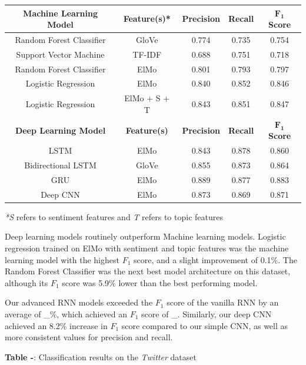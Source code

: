 \documentclass[12pt,a4paper]{article}
\begin{document}
\begin{center}
	\begin{tabular}{ |c||c|c|c|c|}
		\hline
		\textbf{Machine Learning Model}& \textbf{Feature(s)*} & \textbf{Precision} & \textbf{Recall} & \textbf{$\mathbf{F_1}$ Score}\\
		\hline\hline
		Random Forest Classifier & GloVe  & 0.774   & 0.735 & 0.754\\
		Support Vector Machine & TF-IDF  & 0.688   & 0.751 & 0.718\\
		Random Forest Classifier & ElMo  & 0.801   & 0.793 & 0.797\\
		Logistic Regression & ElMo  & 0.840   & 0.852 & 0.846\\
		Logistic Regression & ElMo + S + T & 0.843   & 0.851 & 0.847\\
		\hline\hline
		\textbf{Deep Learning Model}& \textbf{Feature(s)} & \textbf{Precision} & \textbf{Recall} & \textbf{$\mathbf{F_1}$ Score}\\
		\hline
		LSTM & ElMo  & 0.843   & 0.878 & 0.860\\
		Bidirectional LSTM & GloVe  & 0.855   & 0.873 & 0.864\\
		GRU & ElMo  & 0.889   & 0.877 & 0.883\\
		Deep CNN & ElMo & 0.873   & 0.869 & 0.871\\
		\hline
	\end{tabular}
\end{center}
\textit{*S} refers to sentiment features and \textit{T} refers to topic features\\\vspace{-10pt}

\noindent Deep learning models routinely outperform Machine learning models.
Logistic regression trained on ElMo with sentiment and topic features was the machine learning model with the highest $F_1$ score, and a slight improvement of 0.1\%. The Random Forest Classifier was the next best model architecture on this dataset, although its $F_1$ score was 5.9\% lower than the best performing model. 

Our advanced RNN models exceeded the $F_1$ score of the vanilla RNN by an average of \_\%, which achieved an $F_1$ score of \_. Similarly, our deep CNN achieved an 8.2\% increase in $F_1$ score compared to our simple CNN, as well as more consistent values for precision and recall.

\begin{center}
	\textbf{Table -}: Classification results on the \textit{Twitter} dataset
\end{center}
\end{document}
